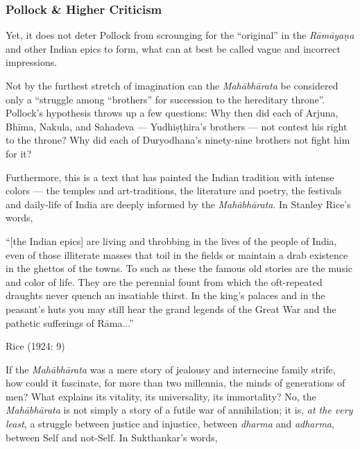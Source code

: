 \subsubsection{Pollock \& Higher Criticism}\label{sec1.1.1.2}

Yet, it does not deter Pollock from scrounging for the “original” in the {\sl Rāmāyaṇa} and other Indian epics to form, what can at best be called vague and incorrect impressions. 

Not by the furthest stretch of imagination can the {\sl Mahābhārata} be considered only a “struggle among “brothers” for succession to the hereditary throne”. Pollock’s hypothesis throws up a few questions: Why then did each of Arjuna, Bhīma, Nakula, and Sahadeva --- Yudhiṣṭhira’s brothers --- not contest his right to the throne? Why did each of Duryodhana’s ninety-nine brothers not fight him for it? 

Furthermore, this is a text that has painted the Indian tradition with intense colors --- the temples and art-traditions, the literature and poetry, the festivals and daily-life of India are deeply informed by the {\sl Mahābhārata}. In Stanley Rice’s words, 

\begin{myquote}
“[the Indian epics] are living and throbbing in the lives of the people of India, even of those illiterate masses that toil in the fields or maintain a drab existence in the ghettos of the towns. To such as these the famous old stories are the music and color of life. They are the perennial fount from which the oft-repeated draughts never quench an insatiable thirst. In the king's palaces and in the peasant's huts you may still hear the grand legends of the Great War and the pathetic sufferings of Rāma...”

\hfill Rice (1924: 9)
\end{myquote}

If the {\sl Mahābhārata} was a mere story of jealousy and internecine family strife, how could it fascinate, for more than two millennia, the minds of generations of men? What explains its vitality, its universality, its immortality? No, the {\sl Mahābhārata} is not simply a story of a futile war of annihilation; it is, {\sl at the very least}, a struggle between justice and injustice, between {\sl dharma} and {\sl adharma}, between Self and not-Self. In Sukthankar’s words,

